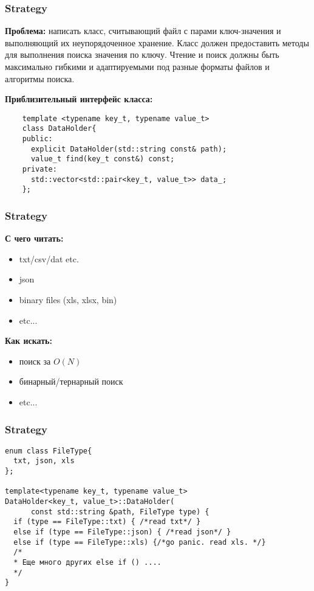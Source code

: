 \begin{frame}[fragile]
	\frametitle{Strategy}
	\textbf{Проблема:} написать класс, считывающий файл с парами ключ-значения и выполняющий их неупорядоченное хранение.
	Класс должен предоставить методы для выполнения поиска значения по ключу. Чтение и поиск должны быть максимально гибкими 
	и адаптируемыми под разные форматы файлов и алгоритмы поиска. 
	
	\vspace{10pt}
	\bf{Приблизительный интерфейс класса:}
	\begin{verbatim}
    template <typename key_t, typename value_t>
    class DataHolder{
    public:
      explicit DataHolder(std::string const& path);
      value_t find(key_t const&) const;
    private:
      std::vector<std::pair<key_t, value_t>> data_;
    };
	\end{verbatim}
\end{frame}

\begin{frame}
  \frametitle{Strategy}
  \textbf{С чего читать:}
  \begin{itemize}
    \item txt/csv/dat etc.
    \item json
    \item binary files (xls, xlsx, bin)
    \item etc...
  \end{itemize} 
  
  \vspace{10pt}
  
  \textbf{Как искать:}
  \begin{itemize}
    \item поиск за $O(N)$
    \item бинарный/тернарный поиск
    \item etc...
  \end{itemize} 

\end{frame}

\begin{frame}[fragile]
  \frametitle{Strategy}
  \begin{verbatim}
enum class FileType{
  txt, json, xls
};

template<typename key_t, typename value_t>
DataHolder<key_t, value_t>::DataHolder(
      const std::string &path, FileType type) {
  if (type == FileType::txt) { /*read txt*/ }
  else if (type == FileType::json) { /*read json*/ }
  else if (type == FileType::xls) {/*go panic. read xls. */}
  /*
  * Еще много других else if () ....
  */
}
  \end{verbatim}  
\end{frame}

